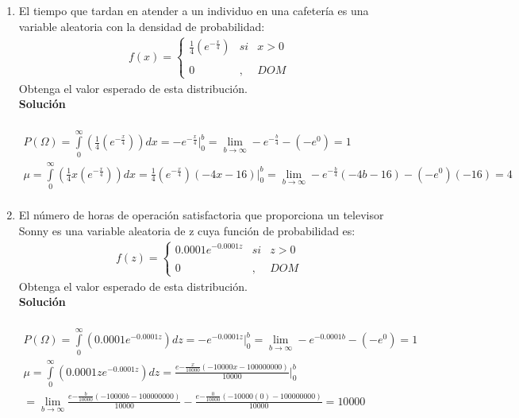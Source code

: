 \begin{enumerate}
    \item El tiempo que tardan en atender a un individuo en una cafetería es una variable aleatoria con la densidad de probabilidad: \\
    \begin{align*}
    f(x)= \left\{ \begin{array}{lcc}
    \frac{1}{4}(e^{-\frac{x}{4}}) &   si  & x > 0 \\
    \\ 0 &  ,  & DOM
    \end{array}
    \right.
    \end{align*}
    Obtenga el valor esperado de esta distribución.
    \\\textbf{Solución}
    \\ \\
    \begin{gather*}
    P(\Omega) = \int \limits_{0}^\infty (\frac{1}{4}(e^{-\frac{x}{4}})) dx = -e^{-\frac{x}{4}} \bigg\vert_{0}^{b} = \lim \limits_{b \rightarrow \infty} -e^{-\frac{b}{4}} - (-e^{0}) = 1 \\
    \mu = \int \limits_{0}^\infty (\frac{1}{4}x(e^{-\frac{x}{4}})) dx = \frac{1}{4}(e^{-\frac{x}{4}})(-4x-16) \bigg\vert_{0}^b = \lim \limits_{b \rightarrow \infty} -e^{-\frac{b}{4}}(-4b -16) - (-e^{0})(-16) = 4 \\
    \end{gather*}
    
    \item El número de horas de operación satisfactoria que proporciona un televisor Sonny es una variable aleatoria de z cuya función de probabilidad es: \\
    \begin{align*}
    f(z)= \left\{ \begin{array}{lcc}
    0.0001e^{-0.0001z} &   si  & z > 0 \\
    \\ 0 &  ,  & DOM
    \end{array}
    \right.
    \end{align*}
    Obtenga el valor esperado de esta distribución.
    \\\textbf{Solución}
    \\ \\
    \begin{gather*}
    P(\Omega) = \int \limits_{0}^{\infty} (0.0001e^{-0.0001z}) dz = -e^{-0.0001z} \bigg\vert_{0}^{b} = \lim \limits_{b \rightarrow \infty} -e^{-0.0001b} - (-e^{0}) = 1 \\
    \mu = \int \limits_{0}^{\infty} (0.0001ze^{-0.0001z}) dz = \frac{e{-\frac{x}{10 000}}(-10 000x - 100 000 000)}{10 000} \bigg\vert_{0}^b \\
    = \lim \limits_{b \rightarrow \infty} \frac{e{-\frac{b}{10 000}}(-10 000b - 100 000 000)}{10 000} - \frac{e{-\frac{0}{10 000}}(-10 000(0) - 100 000 000)}{10 000} = 10 000
    \end{gather*}
    
\end{enumerate}